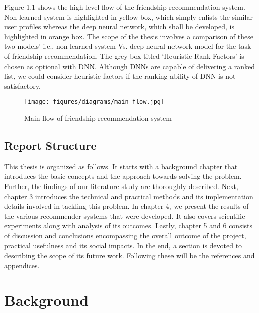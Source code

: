 \documentclass{kththesis}
\begin{document}
Figure 1.1 shows the high-level flow of the friendship recommendation system. Non-learned system is highlighted in yellow box, which simply enlists the similar user profiles whereas the deep neural network, which shall be developed, is highlighted in orange box. The scope of the thesis involves a comparison of these two models' i.e., non-learned system Vs. deep neural network model for the task of friendship recommendation. The grey box titled `Heuristic Rank Factors' is chosen as optional with DNN. Although DNNs are capable of delivering a ranked list, we could consider heuristic factors if the ranking ability of DNN is not satisfactory. \\

\begin{figure}[h!]
\centering
\texttt{[image: figures/diagrams/main\_flow.jpg]}
\caption{Main flow of friendship recommendation system}
\label{fig:mainflow}
\end{figure}

\section{Report Structure}
This thesis is organized as follows. It starts with a background chapter that introduces the basic concepts and the approach towards solving the problem. Further, the findings of our literature study are thoroughly described. Next, chapter 3 introduces the technical and practical methods and its implementation details involved in tackling this problem. In chapter 4, we present the results of the various recommender systems that were developed. It also covers scientific experiments along with analysis of its outcomes. Lastly, chapter 5 and 6 consists of discussion and conclusions encompassing the overall outcome of the project, practical usefulness and its social impacts. In the end, a section is devoted to describing the scope of its future work. Following these will be the references and appendices. 

\chapter{Background}
\end{document}
